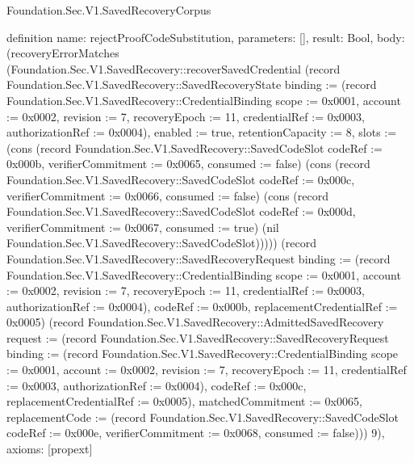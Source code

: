 \begin{lexlean}{Foundation.Sec.V1.SavedRecoveryCorpus}
\begin{semanticmodule}
definition{
  name: rejectProofCodeSubstitution,
  parameters: [],
  result: Bool,
  body: (recoveryErrorMatches (Foundation.Sec.V1.SavedRecovery::recoverSavedCredential (record Foundation.Sec.V1.SavedRecovery::SavedRecoveryState {binding := (record Foundation.Sec.V1.SavedRecovery::CredentialBinding {scope := 0x0001, account := 0x0002, revision := 7, recoveryEpoch := 11, credentialRef := 0x0003, authorizationRef := 0x0004}), enabled := true, retentionCapacity := 8, slots := (cons (record Foundation.Sec.V1.SavedRecovery::SavedCodeSlot {codeRef := 0x000b, verifierCommitment := 0x0065, consumed := false}) (cons (record Foundation.Sec.V1.SavedRecovery::SavedCodeSlot {codeRef := 0x000c, verifierCommitment := 0x0066, consumed := false}) (cons (record Foundation.Sec.V1.SavedRecovery::SavedCodeSlot {codeRef := 0x000d, verifierCommitment := 0x0067, consumed := true}) (nil Foundation.Sec.V1.SavedRecovery::SavedCodeSlot))))}) (record Foundation.Sec.V1.SavedRecovery::SavedRecoveryRequest {binding := (record Foundation.Sec.V1.SavedRecovery::CredentialBinding {scope := 0x0001, account := 0x0002, revision := 7, recoveryEpoch := 11, credentialRef := 0x0003, authorizationRef := 0x0004}), codeRef := 0x000b, replacementCredentialRef := 0x0005}) (record Foundation.Sec.V1.SavedRecovery::AdmittedSavedRecovery {request := (record Foundation.Sec.V1.SavedRecovery::SavedRecoveryRequest {binding := (record Foundation.Sec.V1.SavedRecovery::CredentialBinding {scope := 0x0001, account := 0x0002, revision := 7, recoveryEpoch := 11, credentialRef := 0x0003, authorizationRef := 0x0004}), codeRef := 0x000c, replacementCredentialRef := 0x0005}), matchedCommitment := 0x0065, replacementCode := (record Foundation.Sec.V1.SavedRecovery::SavedCodeSlot {codeRef := 0x000e, verifierCommitment := 0x0068, consumed := false})})) 9),
  axioms: [propext]
}


\end{semanticmodule}
\end{lexlean}

